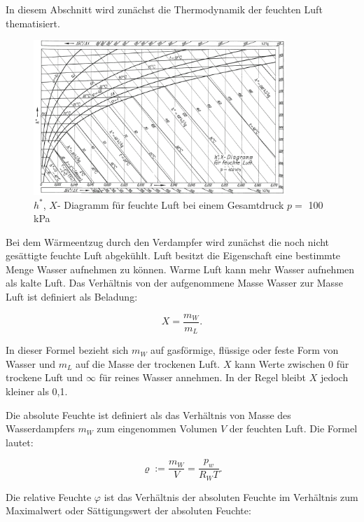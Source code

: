 In diesem Abschnitt  wird zunächst die Thermodynamik der feuchten Luft thematisiert. 


\begin{figure}[htb]
\centering		\includegraphics[width=0.85\textwidth]{Pictures/h_x_Diagramm_Beahr.png}
\caption{$h^*$, $X$- Diagramm für feuchte Luft bei einem Gesamtdruck $p= $ 100 kPa \citep{Baehr2013}}
\label{fig:h_x_diagramm}
\end{figure}


Bei dem Wärmeentzug durch den Verdampfer wird  zunächst die noch nicht gesättigte feuchte Luft abgekühlt. Luft besitzt die Eigenschaft eine bestimmte Menge Wasser aufnehmen zu können. Warme Luft kann mehr Wasser aufnehmen als kalte Luft. Das Verhältnis von der aufgenommene Masse Wasser zur Masse Luft ist definiert als Beladung: 

\begin{equation}
X = \frac{m_W}{m_L}.
\label{eq:Beladung}
\end{equation}

In dieser Formel bezieht sich $m_W$ auf gasförmige, flüssige oder feste Form von Wasser und $m_L$ auf die Masse der trockenen Luft.  $X$ kann Werte zwischen 0 für trockene Luft und $\infty$ für reines Wasser annehmen. In der Regel bleibt $X$ jedoch kleiner als 0,1. 

Die absolute Feuchte ist definiert als das Verhältnis von Masse des Wasserdampfers $m_W$ zum eingenommen Volumen $V$ der feuchten Luft. Die Formel lautet: 

\begin{equation}
\varrho := \frac{m_W}{V} = \frac{p_w}{R_W T}.
\label{eq:Absolute Feuchte}
\end{equation}


Die relative Feuchte $\varphi$ ist das Verhältnis der absoluten Feuchte im Verhältnis zum Maximalwert oder Sättigungswert der absoluten Feuchte: 

